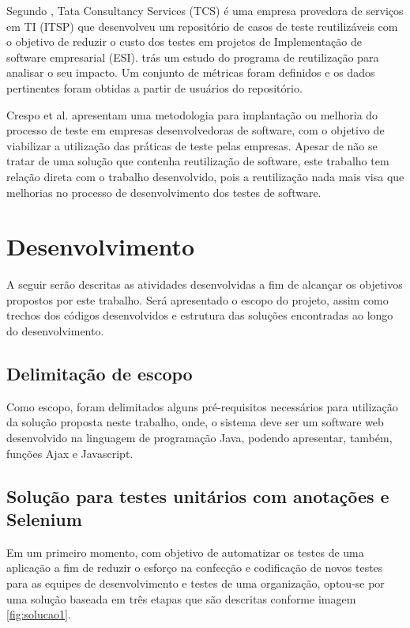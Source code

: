 \documentclass[tg]{mdtufsm}
\begin{document}
Segundo \cite{patel2014test}, Tata Consultancy Services (TCS)  é uma empresa provedora de serviços em TI (ITSP) que desenvolveu um repositório de casos de teste reutilizáveis com o objetivo de reduzir o custo dos testes em projetos de Implementação de software empresarial (ESI).\cite{patel2014test} trás um estudo do programa de reutilização para analisar o seu impacto. Um conjunto de métricas foram definidos e os dados pertinentes foram obtidas a partir de usuários do repositório.

Crespo et al. \citeyearpar{crespo2004metodologia} apresentam uma metodologia para implantação ou melhoria do processo de teste em empresas desenvolvedoras de software, com o objetivo de viabilizar a utilização das práticas de teste pelas empresas. Apesar de não se tratar de uma solução que contenha reutilização de software, este trabalho tem relação direta com o trabalho desenvolvido, pois a reutilização nada mais visa que melhorias no processo de desenvolvimento dos testes de software.

\chapter{Desenvolvimento}

A seguir serão descritas as atividades desenvolvidas a fim de alcançar os objetivos propostos por este trabalho. Será apresentado o escopo do projeto, assim como trechos dos códigos desenvolvidos e estrutura das soluções encontradas ao longo do desenvolvimento.

\section{Delimitação de escopo}

Como escopo, foram delimitados alguns pré-requisitos necessários para utilização da solução proposta neste trabalho, onde, o sistema deve ser um software web desenvolvido na linguagem de programação Java,
podendo apresentar, também, funções Ajax e Javascript.

\section{Solução para testes unitários com anotações e Selenium}
Em um primeiro momento, com objetivo de automatizar os testes de uma aplicação a fim de reduzir o esforço na confecção e codificação de novos testes para as equipes de desenvolvimento e testes de uma organização,
optou-se por uma solução baseada em três etapas que são descritas conforme imagem \ref{fig:solucao1}.
\end{document}
